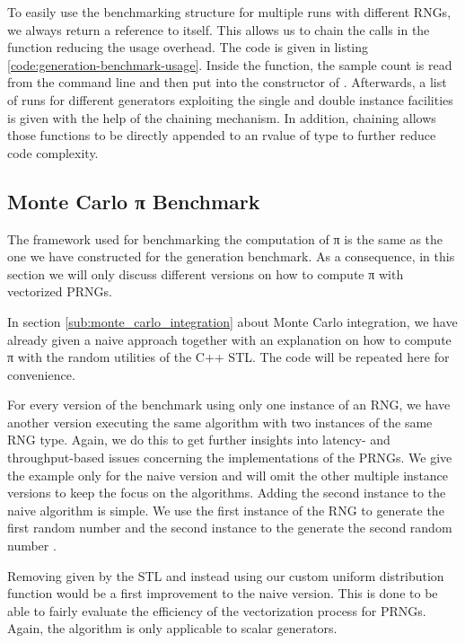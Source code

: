 \documentclass{stdlocal}
\begin{document}
    To easily use the benchmarking structure for multiple runs with different RNGs, we always return a reference to itself.
    This allows us to chain the calls in the  function reducing the usage overhead.
    The code is given in listing \ref{code:generation-benchmark-usage}.
    Inside the  function, the sample count is read from the command line and then put into the constructor of .
    Afterwards, a list of runs for different generators exploiting the single and double instance facilities is given with the help of the chaining mechanism.
    In addition, chaining allows those functions to be directly appended to an rvalue of type  to further reduce code complexity.

  \subsection{Monte Carlo π Benchmark} %
  \label{sub:monte_carlo_π_benchmark}
    The framework used for benchmarking the computation of π is the same as the one we have constructed for the generation benchmark.
    As a consequence, in this section we will only discuss different versions on how to compute π with vectorized PRNGs.

    In section \ref{sub:monte_carlo_integration} about Monte Carlo integration, we have already given a naive approach together with an explanation on how to compute π with the random utilities of the C++ STL.
    The code will be repeated here for convenience.

    For every version of the benchmark using only one instance of an RNG, we have another version executing the same algorithm with two instances of the same RNG type.
    Again, we do this to get further insights into latency- and throughput-based issues concerning the implementations of the PRNGs.
    We give the example only for the naive version and will omit the other multiple instance versions to keep the focus on the algorithms.
    Adding the second instance to the naive algorithm is simple.
    We use the first instance of the RNG to generate the first random number  and the  second instance to the generate the second random number .

    Removing  given by the STL and instead using our custom uniform distribution function would be a first improvement to the naive version.
    This is done to be able to fairly evaluate the efficiency of the vectorization process for PRNGs.
    Again, the algorithm is only applicable to scalar generators.
\end{document}

